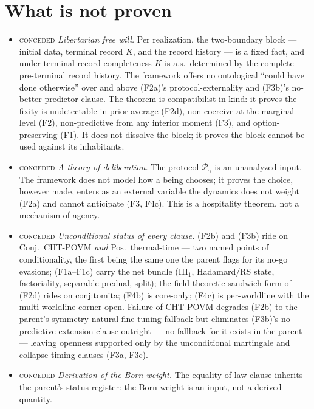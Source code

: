 \documentclass[11pt]{article}
\newcommand{\CONCEDED}{{\normalfont\scshape conceded}}          %
\newcommand{\PP}{\mathcal P}
\begin{document}
\section{What is not proven}\label{sec:notproven}

\begin{itemize}
\item \CONCEDED{} \emph{Libertarian free will.} Per realization, the two-boundary
block --- initial data, terminal record $K$, and the record history --- is a
fixed fact, and under terminal record-completeness $K$ is a.s.\ determined by
the complete pre-terminal record history. The framework offers no ontological
``could have done otherwise'' over and above (F2a)'s protocol-externality and
(F3b)'s no-better-predictor clause. The theorem is compatibilist in kind: it
proves the fixity is undetectable in prior average (F2d), non-coercive at the
marginal level (F2), non-predictive from any interior moment (F3), and
option-preserving (F1). It does not dissolve the block; it proves the block
cannot be used against its inhabitants.
\item \CONCEDED{} \emph{A theory of deliberation.} The protocol $\PP_\gamma$ is
an unanalyzed input. The framework does not model how a being chooses; it
proves the choice, however made, enters as an external variable the dynamics
does not weight (F2a) and cannot anticipate (F3, F4c). This is a hospitality
theorem, not a mechanism of agency.
\item \CONCEDED{} \emph{Unconditional status of every clause.} (F2b) and (F3b)
ride on Conj.\ \textsf{CHT-POVM} \emph{and} Pos.\ thermal-time --- two named
points of conditionality, the first being the same one the parent flags for its
no-go evasions; (F1a--F1c) carry the net bundle (III$_1$, Hadamard/RS state,
factoriality, separable predual, split); the field-theoretic sandwich form of
(F2d) rides on \textsf{conj:tomita}; (F4b) is core-only; (F4c) is per-worldline
with the multi-worldline corner open. Failure of \textsf{CHT-POVM} degrades
(F2b) to the parent's symmetry-natural fine-tuning fallback but eliminates
(F3b)'s no-predictive-extension clause outright --- no fallback for it exists in
the parent --- leaving openness supported only by the unconditional martingale
and collapse-timing clauses (F3a, F3c).
\item \CONCEDED{} \emph{Derivation of the Born weight.} The equality-of-law
clause inherits the parent's status register: the Born weight is an input, not
a derived quantity.
\end{itemize}
\end{document}
